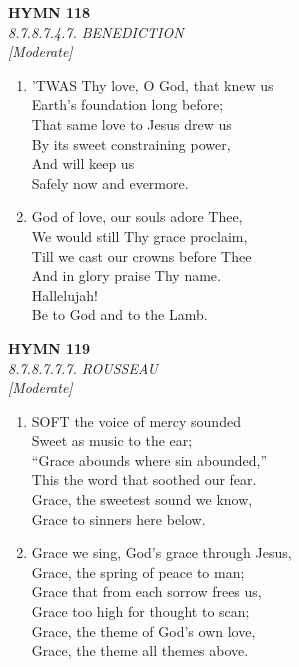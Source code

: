 \documentclass[11pt,a4paper]{article}
\begin{document}
\newpage
\begin{center}
    {\Large \textbf{HYMN 118}}
    \\
    \textit{8.7.8.7.4.7. BENEDICTION}
    \\
    \textit{\small [Moderate]}
\end{center}
\vspace{1em}

\begin{enumerate}
    \item 'TWAS Thy love, O God, that knew us \\
        Earth's foundation long before; \\
        That same love to Jesus drew us \\
        By its sweet constraining power, \\
        And will keep us \\
        Safely now and evermore.

    \item God of love, our souls adore Thee, \\
        We would still Thy grace proclaim, \\
        Till we cast our crowns before Thee \\
        And in glory praise Thy name. \\
        Hallelujah! \\
        Be to God and to the Lamb.

\end{enumerate}

\newpage
\begin{center}
    {\Large \textbf{HYMN 119}}
    \\
    \textit{8.7.8.7.7.7. ROUSSEAU}
    \\
    \textit{\small [Moderate]}
\end{center}
\vspace{1em}

\begin{enumerate}
    \item SOFT the voice of mercy sounded \\
        Sweet as music to the ear; \\
        ``Grace abounds where sin abounded,'' \\
        This the word that soothed our fear. \\
        Grace, the sweetest sound we know, \\
        Grace to sinners here below.

    \item Grace we sing, God's grace through Jesus, \\
        Grace, the spring of peace to man; \\
        Grace that from each sorrow frees us, \\
        Grace too high for thought to scan; \\
        Grace, the theme of God's own love, \\
        Grace, the theme all themes above.

\end{enumerate}
\end{document}
